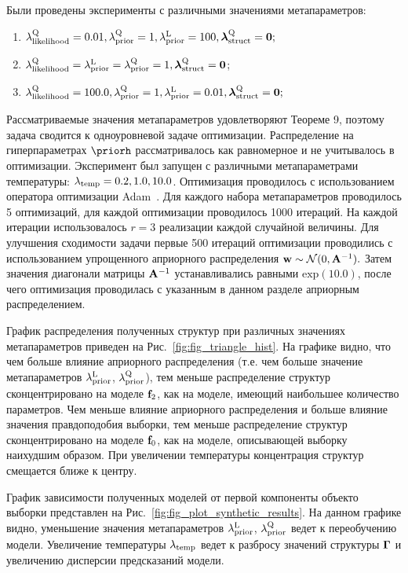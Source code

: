 Были проведены эксперименты с различными значениями метапараметров:
\begin{enumerate}
\item $\lambda_\text{likelihood}^\text{Q} = 0.01, \lambda_\text{prior}^\text{Q} = 1, \lambda_\text{prior}^\text{L} = 100, \boldsymbol{\lambda}_\text{struct}^\text{Q} = \mathbf{0};$
\item $\lambda_\text{likelihood}^\text{Q} = \lambda_\text{prior}^\text{L} = \lambda_\text{prior}^\text{Q} = 1, \boldsymbol{\lambda}_\text{struct}^\text{Q} = \mathbf{0}$;
\item $\lambda_\text{likelihood}^\text{Q} = 100.0, \lambda_\text{prior}^\text{Q} = 1, \lambda_\text{prior}^\text{L} = 0.01, \boldsymbol{\lambda}_\text{struct}^\text{Q} = \mathbf{0};$
\end{enumerate}
Рассматриваемые значения метапараметров удовлетворяют Теореме 9, поэтому задача сводится к одноуровневой задаче оптимизации.
Распределение на гиперпараметрах $\priorh$ рассматривалось как равномерное и не учитывалось в оптимизации. Эксперимент был запущен с различными метапараметрами температуры: $\lambda_{\text{temp}} = 0.2, 1.0, 10.0$. Оптимизация проводилось с использованием оператора оптимизации Adam~\cite{adam}. Для каждого набора метапараметров проводилось 5 оптимизаций, для каждой оптимизации проводилось 1000 итераций. На каждой итерации использовалось $r=3$ реализации каждой случайной величины.  Для улучшения сходимости задачи первые 500 итераций оптимизации проводились с использованием упрощенного априорного распределения $\mathbf{w} \sim \mathcal{N}(0, \mathbf{A}^{-1}).$  Затем значения диагонали матрицы $\mathbf{A}^{-1}$ устанавливались равными $\text{exp}(10.0)$, после чего оптимизация проводилась с указанным в данном разделе априорным распределением. 

График распределения полученных структур при различных значениях метапараметров приведен на Рис.~\ref{fig:fig_triangle_hist}. На графике видно, что чем больше влияние априорного распределения (т.е. чем больше значение метапараметров $\lambda_\text{prior}^\text{L}$, $\lambda_\text{prior}^\text{Q}$), тем меньше распределение структур сконцентрировано на моделе $\mathbf{f}_2$, как на моделе, имеющий наибольшее количество параметров. Чем меньше влияние априорного распределения и больше влияние значения правдоподобия выборки, тем меньше распределение структур сконцентрировано на моделе $\mathbf{f}_0$, как на моделе, описывающей выборку наихудшим образом. При увеличении температуры концентрация структур смещается ближе к центру.

График зависимости полученных моделей от первой компоненты объекто выборки представлен на Рис.~\ref{fig:fig_plot_synthetic_results}. На данном графике видно, уменьшение значения метапараметров $\lambda_\text{prior}^\text{L}$, $\lambda_\text{prior}^\text{Q}$ ведет к переобучению модели. Увеличение температуры $\lambda_{\text{temp}}$ ведет к разбросу значений структуры $\boldsymbol{\Gamma}$ и увеличению дисперсии предсказаний модели.




